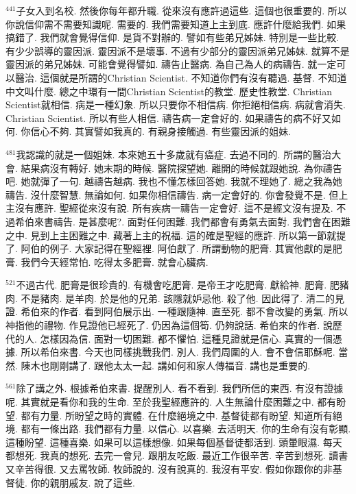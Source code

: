 \documentclass{book}
\begin{document}
$^{441}$子女入到名校.
然後你每年都升職.
從來沒有應許過這些.
這個也很重要的.
所以你說信仰需不需要知識呢.
需要的.
我們需要知道上主到底.
應許什麼給我們.
如果搞錯了.
我們就會覺得信仰.
是貨不對辦的.
譬如有些弟兄姊妹.
特別是一些比較.
有少少誤導的靈因派.
靈因派不是壞事.
不過有少部分的靈因派弟兄姊妹.
就算不是靈因派的弟兄姊妹.
可能會覺得譬如.
禱告止醫病.
為自己為人的病禱告.
就一定可以醫治.
這個就是所謂的Christian Scientist.
不知道你們有沒有聽過.
基督.
不知道中文叫什麼.
總之中環有一間Christian Scientist的教堂.
歷史性教堂.
Christian Scientist就相信.
病是一種幻象.
所以只要你不相信病.
你拒絕相信病.
病就會消失.
Christian Scientist.
所以有些人相信.
禱告病一定會好的.
如果禱告的病不好又如何.
你信心不夠.
其實譬如我真的.
有親身接觸過.
有些靈因派的姐妹.

$^{481}$我認識的就是一個姐妹.
本來她五十多歲就有癌症.
去過不同的.
所謂的醫治大會.
結果病沒有轉好.
她末期的時候.
醫院探望她.
離開的時候就跟她說.
為你禱告吧.
她就彈了一句.
越禱告越病.
我也不懂怎樣回答她.
我就不理她了.
總之我為她禱告.
沒什麼智慧.
無論如何.
如果你相信禱告.
病一定會好的.
你會發覺不是.
但上主沒有應許.
聖經從來沒有說.
所有疾病一禱告一定會好.
這不是經文沒有提及.
不過希伯來書禱告.
是甚麼呢?.
面對任何困難.
我們都會有勇氣去面對.
我們會在困難之中.
見到上主困難之中.
藏著上主的祝福.
這的確是聖經的應許.
所以第一節就提了.
阿伯的例子.
大家記得在聖經裡.
阿伯獻了.
所謂動物的肥膏.
其實他獻的是肥膏.
我們今天經常怕.
吃得太多肥膏.
就會心臟病.

$^{521}$不過古代.
肥膏是很珍貴的.
有機會吃肥膏.
是帝王才吃肥膏.
獻給神.
肥膏.
肥豬肉.
不是豬肉.
是羊肉.
於是他的兄弟.
該隱就妒忌他.
殺了他.
因此得了.
清二的見證.
希伯來的作者.
看到阿伯展示出.
一種跟隨神.
直至死.
都不會改變的勇氣.
所以神指他的禮物.
作見證他已經死了.
仍因為這個筍.
仍夠說話.
希伯來的作者.
說歷代的人.
怎樣因為信.
面對一切困難.
都不懼怕.
這種見證就是信心.
真實的一個憑據.
所以希伯來書.
今天也同樣挑戰我們.
別人.
我們周圍的人.
會不會信耶穌呢.
當然.
陳木也剛剛講了.
跟他太太一起.
講如何和家人傳福音.
講也是重要的.

$^{561}$除了講之外.
根據希伯來書.
提醒別人.
看不看到.
我們所信的東西.
有沒有證據呢.
其實就是看你和我的生命.
至於我聖經應許的.
人生無論什麼困難之中.
都有盼望.
都有力量.
所盼望之時的實體.
在什麼絕境之中.
基督徒都有盼望.
知道所有絕境.
都有一條出路.
我們都有力量.
以信心.
以喜樂.
去活明天.
你的生命有沒有彰顯.
這種盼望.
這種喜樂.
如果可以這樣想像.
如果每個基督徒都活到.
頭暈眼濕.
每天都想死.
我真的想死.
去完一會兒.
跟朋友吃飯.
最近工作很辛苦.
辛苦到想死.
讀書又辛苦得很.
又去罵牧師.
牧師說的.
沒有說真的.
我沒有平安.
假如你跟你的非基督徒.
你的親朋戚友.
說了這些.
\end{document}
